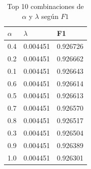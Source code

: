 \begin{table}[htbp]
\centering
\caption{Top 10 combinaciones de $\alpha$ y $\lambda$ según $F1$}
\label{tab:enet_f1}
\begin{tabular}{lll}  %
\hline
$\alpha$ & $\lambda$ & F1 \\
\hline
0.4 & 0.004451 & 0.926726 \\
0.2 & 0.004451 & 0.926662 \\
0.1 & 0.004451 & 0.926643 \\
0.6 & 0.004451 & 0.926614 \\
0.5 & 0.004451 & 0.926613 \\
0.7 & 0.004451 & 0.926570 \\
0.8 & 0.004451 & 0.926517 \\
0.3 & 0.004451 & 0.926504 \\
0.9 & 0.004451 & 0.926389 \\
1.0 & 0.004451 & 0.926301 \\
\hline
\end{tabular}
\end{table}
